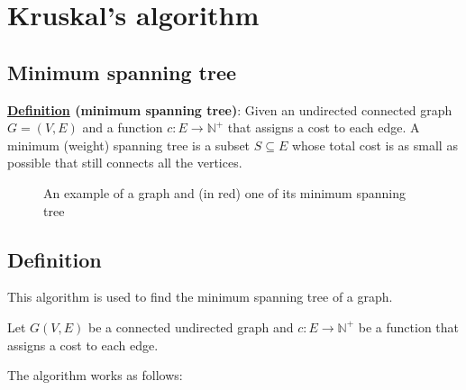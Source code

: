 \documentclass[12pt]{extarticle}
\newcommand{\N}{\mathbb{N}}
\begin{document}
\section{Kruskal's algorithm}

\subsection{Minimum spanning tree}

\textbf{\underline{Definition} (minimum spanning tree)}: Given an undirected connected graph $G = (V, E)$ and a function $c: E \to \N^+$ that assigns a cost to each edge. A minimum (weight) spanning tree is a subset $S \subseteq E$ whose total cost is as small as possible that still connects all the vertices.

\begin{figure}[H]
    \centering
    \caption{An example of a graph and (in red) one of its minimum spanning tree}
    \label{fig:minimum_spanning_tree}
\end{figure}

\subsection{Definition}

This algorithm is used to find the minimum spanning tree of a graph.

Let $G(V,E)$ be a connected undirected graph and $c: E \to \N^+$ be a function that assigns a cost to each edge.

The algorithm works as follows:
\end{document}
